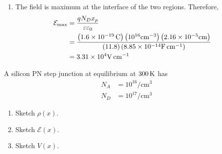 \documentclass[titlepage, fleqn, a4paper, 12pt, twoside]{article}
\theoremstyle{definition}
\theoremstyle{theorem}
\begin{document}
\begin{solution}
\begin{enumerate}[leftmargin=*]
\begin{figure}[H]
			\end{figure}
		\item
			The field is maximum at the interface of the two regions.
			Therefore,
			\begin{align*}
				\mathcal{E}_{\text{max}} & = \frac{q N_D x_p}{\varepsilon \varepsilon_0}                                                                                                                                                                                        \\
                                                         & = \frac{\left( 1.6 \times 10^{-19} \coulomb \right) \left( 10^{16} \si{\per\centi\metre\cubed} \right) \left( 2.16 \times 10^{-5} \si{\centi\metre} \right)}{(11.8) \left( 8.85 \times 10^{-14} \si{\farad\per\centi\metre} \right)} \\
                                                         & = 3.31 \times 10^4 \si{\volt\per\centi\metre}
			\end{align*}
	\end{enumerate}
\end{solution}

\begin{question}
	A silicon PN step junction at equilibrium at $300 \kelvin$ has
	\begin{align*}
		N_A & = 10^{16} \si{\per\centi\metre\cubed} \\
		N_D & = 10^{17} \si{\per\centi\metre\cubed}
	\end{align*}
	\begin{enumerate}
		\item Sketch $\rho(x)$.
		\item Sketch $\mathcal{E}(x)$.
		\item Sketch $V(x)$.
	\end{enumerate}
\end{question}
\end{document}
